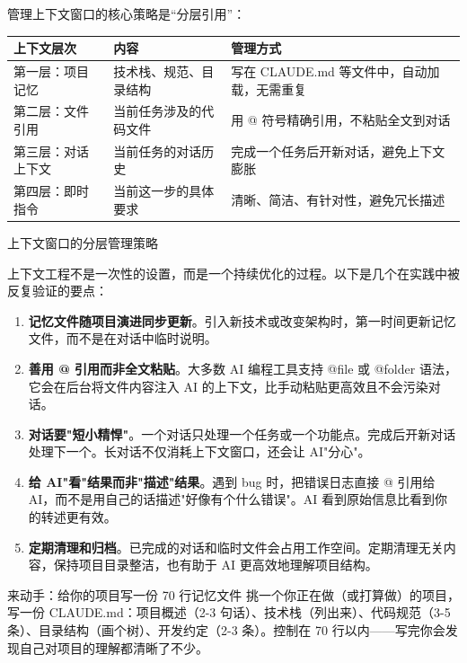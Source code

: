 管理上下文窗口的核心策略是“分层引用”：

\begin{center}
\begin{tabularx}{\linewidth}{|X|X|X|}
\hline
\textbf{上下文层次} & \textbf{内容} & \textbf{管理方式} \tabularnewline
\hline
第一层：项目记忆 & 技术栈、规范、目录结构 & 写在 CLAUDE.md 等文件中，自动加载，无需重复 \tabularnewline
第二层：文件引用 & 当前任务涉及的代码文件 & 用 @ 符号精确引用，不粘贴全文到对话 \tabularnewline
第三层：对话上下文 & 当前任务的对话历史 & 完成一个任务后开新对话，避免上下文膨胀 \tabularnewline
第四层：即时指令 & 当前这一步的具体要求 & 清晰、简洁、有针对性，避免冗长描述 \tabularnewline
\hline
\end{tabularx}
\end{center}

\begin{center}\small\color{gray}上下文窗口的分层管理策略\end{center}


上下文工程不是一次性的设置，而是一个持续优化的过程。以下是几个在实践中被反复验证的要点：

\begin{enumerate}
  \item \textbf{记忆文件随项目演进同步更新}。引入新技术或改变架构时，第一时间更新记忆文件，而不是在对话中临时说明。
  \item \textbf{善用 @ 引用而非全文粘贴}。大多数 AI 编程工具支持 @file 或 @folder 语法，它会在后台将文件内容注入 AI 的上下文，比手动粘贴更高效且不会污染对话。
  \item \textbf{对话要"短小精悍"}。一个对话只处理一个任务或一个功能点。完成后开新对话处理下一个。长对话不仅消耗上下文窗口，还会让 AI"分心"。
  \item \textbf{给 AI"看"结果而非"描述"结果}。遇到 bug 时，把错误日志直接 @ 引用给 AI，而不是用自己的话描述"好像有个什么错误"。AI 看到原始信息比看到你的转述更有效。
  \item \textbf{定期清理和归档}。已完成的对话和临时文件会占用工作空间。定期清理无关内容，保持项目目录整洁，也有助于 AI 更高效地理解项目结构。
\end{enumerate}

\begin{tcbpractice}{来动手：给你的项目写一份 70 行记忆文件}
挑一个你正在做（或打算做）的项目，写一份 CLAUDE.md：项目概述（2-3 句话）、技术栈（列出来）、代码规范（3-5 条）、目录结构（画个树）、开发约定（2-3 条）。控制在 70 行以内——写完你会发现自己对项目的理解都清晰了不少。

\end{tcbpractice}

